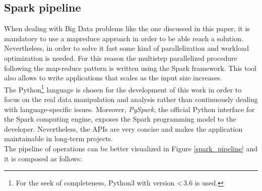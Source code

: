 \documentclass{sig-alternate-05-2015}
\begin{document}
\subsection{Spark pipeline}
When dealing with Big Data problems like the one discussed in this paper, it is mandatory to use a map\-reduce approach in order to be able reach a solution. Nevertheless, in order to solve it fast some kind of parallelization and workload optimization is needed. For this reason the multi\-step parallelized procedure following the map-reduce pattern is written using the Spark framework. This tool also allows to write applications that scales as the input size increases.\\
The Python\footnote{For the seek of completeness, Python3 with version \textless\,3.6 is used.} language is chosen for the development of this work in order to focus on the real data manipulation and analysis rather than continuously dealing with language-specific issues. Moreover, \emph{PySpark}, the official Python interface for the Spark computing engine, exposes the Spark programming model to the developer. Nevertheless, the APIs are very concise and makes the application maintainable in long-term projects.\\
The pipeline of operations can be better visualized in Figure \ref{spark_pipeline} and it is composed as follows:
\end{document}
